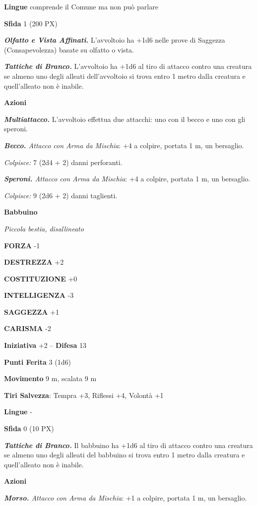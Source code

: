 \begin{multicols}{2}
	\textbf{Lingue} comprende il Comune ma non può parlare

	\textbf{Sfida} 1 (200 PX)

	\textit{\textbf{Olfatto e Vista Affinati.}} L'avvoltoio ha +1d6 nelle prove di Saggezza (Consapevolezza) basate su olfatto o vista.

	\textit{\textbf{Tattiche di Branco.}} L'avvoltoio ha +1d6 al tiro di attacco contro una creatura se almeno uno degli alleati dell'avvoltoio si trova entro 1 metro dalla creatura e quell'alleato non è inabile.

	\textbf{Azioni}

	\textit{\textbf{Multiattacco.}} L'avvoltoio effettua due attacchi: uno con il becco e uno con gli speroni.

	\textit{\textbf{Becco.} Attacco con Arma da Mischia}: +4 a colpire, portata 1 m, un bersaglio.

	\textit{Colpisce:} 7 (2d4 + 2) danni perforanti.

	\textit{\textbf{Speroni.} Attacco con Arma da Mischia}: +4 a colpire, portata 1 m, un bersaglio.

	\textit{Colpisce:} 9 (2d6 + 2) danni taglienti.

	\medskip\textbf{Babbuino}

	\textit{Piccola bestia, disallineato}

	\textbf{FORZA} -1

	\textbf{DESTREZZA} +2

	\textbf{COSTITUZIONE} +0

	\textbf{INTELLIGENZA} -3

	\textbf{SAGGEZZA} +1

	\textbf{CARISMA} -2

	\textbf{Iniziativa} +2 -- \textbf{Difesa} 13

	\textbf{Punti Ferita} 3 (1d6)

	\textbf{Movimento} 9 m, scalata 9 m

	\textbf{Tiri Salvezza}: Tempra +3, Riflessi +4, Volontà +1

	\textbf{Lingue} -

	\textbf{Sfida} 0 (10 PX)

	\textit{\textbf{Tattiche di Branco.}} Il babbuino ha +1d6 al tiro di attacco contro una creatura se almeno uno degli alleati del babbuino si trova entro 1 metro dalla creatura e quell'alleato non è inabile.

	\textbf{Azioni}

	\textit{\textbf{Morso.} Attacco con Arma da Mischia}: +1 a colpire, portata 1 m, un bersaglio.


\end{multicols}
